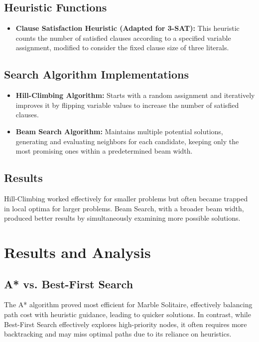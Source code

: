 \documentclass[conference]{IEEEtran}
\begin{document}
\subsection{Heuristic Functions}
\begin{itemize}
    \item \textbf{Clause Satisfaction Heuristic (Adapted for 3-SAT):} This heuristic counts the number of satisfied clauses according to a specified variable assignment, modified to consider the fixed clause size of three literals.
\end{itemize}

\subsection{Search Algorithm Implementations}
\begin{itemize}
    \item \textbf{Hill-Climbing Algorithm:} Starts with a random assignment and iteratively improves it by flipping variable values to increase the number of satisfied clauses.
    \item \textbf{Beam Search Algorithm:} Maintains multiple potential solutions, generating and evaluating neighbors for each candidate, keeping only the most promising ones within a predetermined beam width.
\end{itemize}

\subsection{Results}
Hill-Climbing worked effectively for smaller problems but often became trapped in local optima for larger problems. Beam Search, with a broader beam width, produced better results by simultaneously examining more possible solutions.

\section{Results and Analysis}
\subsection{A* vs. Best-First Search}
The A* algorithm proved most efficient for Marble Solitaire, effectively balancing path cost with heuristic guidance, leading to quicker solutions. In contrast, while Best-First Search effectively explores high-priority nodes, it often requires more backtracking and may miss optimal paths due to its reliance on heuristics.
\end{document}
